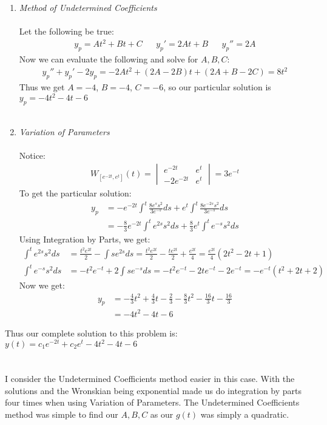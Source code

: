 \documentclass[12pt]{article}
\begin{document}
	\begin{enumerate}[label = (\alph*)]
		\item \textit{Method of Undetermined Coefficients}
		\\ \\
		Let the following be true:
			\begin{align*}
				y_p = At^2 + Bt + C &&	y_p' = 2At + B &&	y_p'' = 2A
			\end{align*}
		Now we can evaluate the following and solve for $A,B,C$:
			\begin{align*}
				y_p'' + y_p' -2y_p = -2At^2 + (2A - 2B)t + (2A + B -2C)  = 8t^2
			\end{align*}
		Thus we get $A = -4$, $B = -4$, $C = -6$, so our particular solution is $y_p = -4t^2 - 4t - 6$
		\\ \\
		\item \textit{Variation of Parameters}
		\\ \\
		Notice:
			\begin{align*}
				W_{[e^{-2t}, e^{t}]}(t) = 
				\begin{vmatrix}
					e^{-2t} & e^{t} \\
					-2e^{-2t} & e^{t}
				\end{vmatrix} 
				= 3e^{-t}
			\end{align*}
		To get the particular solution:
			\begin{align*}
				y_p &= -e^{-2t}\int^t \frac{8e^{s}s^2}{3e^{-s}}ds + e^{t}\int^t \frac{8e^{-2s}s^2}{3e^{-s}}ds \\
				&= -\frac{8}{3}e^{-2t}\int^te^{2s}s^2ds + \frac{8}{3}e^{t}\int^t e^{-s}s^2ds 
			\end{align*}
		Using Integration by Parts, we get:
			\begin{align*}
				\int^te^{2s}s^2ds &= \frac{t^2e^{2t}}{2} - \int se^{2s}ds = \frac{t^2e^{2t}}{2} - \frac{te^{2t}}{2} + \frac{e^{2t}}{4} = \frac{e^{2t}}{4}(2t^2 - 2t + 1)
				\\ 
				\int^t e^{-s}s^2ds &= -t^2e^{-t} + 2\int se^{-s}ds = -t^2e^{-t} -2te^{-t} -2e^{-t} = -e^{-t}(t^2 + 2t +2)
			\end{align*}
		Now we get:
			\begin{align*}
				y_p &= -\frac{4}{3}t^2 + \frac{4}{3}t -\frac{2}{3} - \frac{8}{3}t^2 - \frac{16}{3}t - \frac{16}{3} \\
				&= -4t^2-4t -6
			\end{align*}
	\end{enumerate}
Thus our complete solution to this problem is: $y(t) = c_1e^{-2t} + c_2e^{t} -4t^2-4t -6 $
\\ \\ \\
I consider the Undetermined Coefficients method easier in this case. With the solutions and the Wronskian being exponential made us do integration by parts four times when using Variation of Parameters.  The Undetermined Coefficients method was simple to find our $A,B,C$ as our $g(t)$ was simply a quadratic. 
\end{document}
